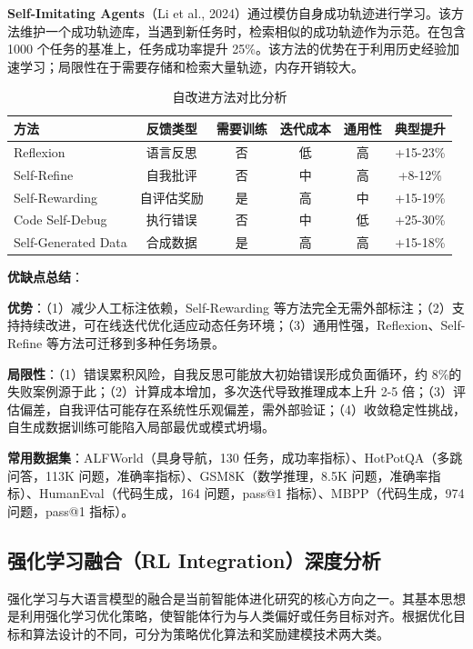 \documentclass[12pt,a4paper]{article}
\begin{document}
\textbf{Self-Imitating Agents}（Li et al., 2024）通过模仿自身成功轨迹进行学习。该方法维护一个成功轨迹库，当遇到新任务时，检索相似的成功轨迹作为示范。在包含 1000 个任务的基准上，任务成功率提升 25\%。该方法的优势在于利用历史经验加速学习；局限性在于需要存储和检索大量轨迹，内存开销较大。

\begin{table}[h]
\centering
\caption{自改进方法对比分析}
\label{tab:self-improve-compare}
\begin{tabular}{@{}lccccc@{}}
\toprule
\textbf{方法} & \textbf{反馈类型} & \textbf{需要训练} & \textbf{迭代成本} & \textbf{通用性} & \textbf{典型提升} \\
\midrule
Reflexion & 语言反思 & 否 & 低 & 高 & +15-23\% \\
Self-Refine & 自我批评 & 否 & 中 & 高 & +8-12\% \\
Self-Rewarding & 自评估奖励 & 是 & 高 & 中 & +15-19\% \\
Code Self-Debug & 执行错误 & 否 & 中 & 低 & +25-30\% \\
Self-Generated Data & 合成数据 & 是 & 高 & 高 & +15-18\% \\
\bottomrule
\end{tabular}
\end{table}

\textbf{优缺点总结}：

\textbf{优势}：（1）减少人工标注依赖，Self-Rewarding 等方法完全无需外部标注；（2）支持持续改进，可在线迭代优化适应动态任务环境；（3）通用性强，Reflexion、Self-Refine 等方法可迁移到多种任务场景。

\textbf{局限性}：（1）错误累积风险，自我反思可能放大初始错误形成负面循环，约 8\%的失败案例源于此；（2）计算成本增加，多次迭代导致推理成本上升 2-5 倍；（3）评估偏差，自我评估可能存在系统性乐观偏差，需外部验证；（4）收敛稳定性挑战，自生成数据训练可能陷入局部最优或模式坍塌。

\textbf{常用数据集}：ALFWorld（具身导航，130 任务，成功率指标）、HotPotQA（多跳问答，113K 问题，准确率指标）、GSM8K（数学推理，8.5K 问题，准确率指标）、HumanEval（代码生成，164 问题，pass@1 指标）、MBPP（代码生成，974 问题，pass@1 指标）。

\subsection{强化学习融合（RL Integration）深度分析}

强化学习与大语言模型的融合是当前智能体进化研究的核心方向之一。其基本思想是利用强化学习优化策略，使智能体行为与人类偏好或任务目标对齐。根据优化目标和算法设计的不同，可分为策略优化算法和奖励建模技术两大类。
\end{document}
